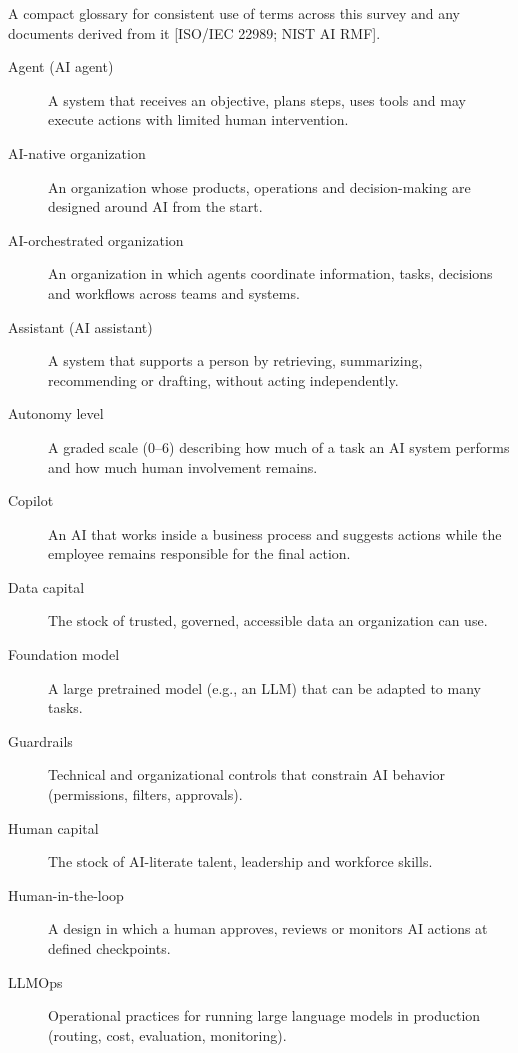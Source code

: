 
A compact glossary for consistent use of terms across this survey and any
documents derived from it [ISO/IEC 22989; NIST AI RMF].

\begin{description}
  \item[Agent (AI agent)] A system that receives an objective, plans steps,
        uses tools and may execute actions with limited human intervention.
  \item[AI-native organization] An organization whose products, operations
        and decision-making are designed around AI from the start.
  \item[AI-orchestrated organization] An organization in which agents
        coordinate information, tasks, decisions and workflows across teams
        and systems.
  \item[Assistant (AI assistant)] A system that supports a person by
        retrieving, summarizing, recommending or drafting, without acting
        independently.
  \item[Autonomy level] A graded scale (0--6) describing how much of a task
        an AI system performs and how much human involvement remains.
  \item[Copilot] An AI that works inside a business process and suggests
        actions while the employee remains responsible for the final action.
  \item[Data capital] The stock of trusted, governed, accessible data an
        organization can use.
  \item[Foundation model] A large pretrained model (e.g., an LLM) that can be
        adapted to many tasks.
  \item[Guardrails] Technical and organizational controls that constrain AI
        behavior (permissions, filters, approvals).
  \item[Human capital] The stock of AI-literate talent, leadership and
        workforce skills.
  \item[Human-in-the-loop] A design in which a human approves, reviews or
        monitors AI actions at defined checkpoints.
  \item[LLMOps] Operational practices for running large language models in
        production (routing, cost, evaluation, monitoring).

\end{description}
